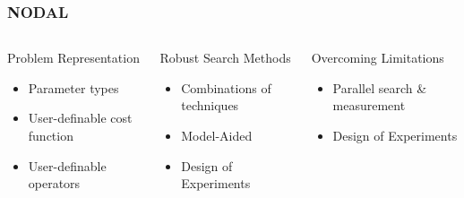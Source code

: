 \documentclass[10pt, compress, aspectratio=169]{beamer}
\begin{document}
\begin{frame}
    \frametitle{NODAL}
    \begin{columns}[c]
        \begin{block}{Problem Representation}
            \begin{itemize}
                \item Parameter \alert{types}
                \item \alert{User-definable cost function}
                \item User-definable \alert{operators}
            \end{itemize}
        \end{block}

        \begin{block}{Robust Search Methods}
            \begin{itemize}
                \item \alert{Combinations} of techniques
                \item \alert{Model-Aided}
                \item \alert{Design of Experiments}
            \end{itemize}
        \end{block}

        \pause

        \begin{block}{Overcoming Limitations}
            \begin{itemize}
                \item Parallel \alert{search \& measurement}
                \item \alert{Design of Experiments}
            \end{itemize}
        \end{block}

    \end{columns}
\end{frame}
\end{document}
